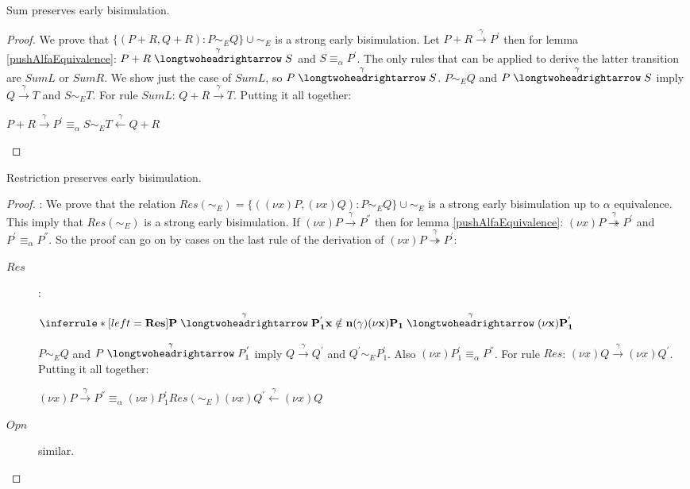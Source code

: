 \begin{lemma}
  Sum preserves early bisimulation. 
  \begin{proof}
    We prove that $\{(P+R, Q+R): P\sim_{E}Q\}\cup \sim_{E}$ is a strong early bisimulation. Let $P+R\xrightarrow{\gamma}P^{'}$ then for lemma \ref{pushAlfaEquivalence}: $P+R\stackrel{\gamma}{\longtwoheadrightarrow} S$ and $S\equiv_{\alpha}P^{'}$. The only rules that can be applied to derive the latter transition are $SumL$ or $SumR$. We show just the case of $SumL$, so $P\stackrel{\gamma}{\longtwoheadrightarrow} S$. $P\sim_{E} Q$ and $P\stackrel{\gamma}{\longtwoheadrightarrow} S$ imply $Q\xrightarrow{\gamma} T$ and $S\sim_{E} T$. For rule $SumL$: $Q+R\xrightarrow{\gamma} T$. Putting it all together:
    \begin{center}
      $P+R\xrightarrow{\gamma}P^{'} \equiv_{\alpha} S \sim_{E} T \stackrel{\gamma}{\longleftarrow} Q+R$
    \end{center}
  \end{proof}
\end{lemma}

\begin{lemma}
  Restriction preserves early bisimulation.
  \begin{proof}:
      We prove that the relation $Res(\sim_{E})=\{((\nu x)P, (\nu x)Q): P\sim_{E} Q\} \cup \sim_{E}$ is a strong early bisimulation up to $\alpha$ equivalence. This imply that $Res(\sim_{E})$ is a strong early bisimulation. If $(\nu x)P\xrightarrow{\gamma}P^{''}$ then for lemma \ref{pushAlfaEquivalence}: $(\nu x)P\stackrel{\gamma}{\twoheadrightarrow}P^{'}$ and $P^{'}\equiv_{\alpha}P^{''}$. So the proof can go on by cases on the last rule of the derivation of $(\nu x)P\stackrel{\gamma}{\twoheadrightarrow} P^{'}$:
	\begin{description}
 	  \item[$Res$]:
   	    \begin{center}
   	      $\inferrule* [left=\bf{Res}]{
		    P \stackrel{\gamma}{\longtwoheadrightarrow} P_{1}^{'}
		  \\
		    x \notin n(\gamma)
		  }{
		    (\nu x)P_{1} \stackrel{\gamma}{\longtwoheadrightarrow} (\nu x)P_{1}^{'}
	      }$
   	    \end{center}
 	    $P\sim_{E}Q$ and $P \stackrel{\gamma}{\longtwoheadrightarrow} P_{1}^{'}$ imply $Q \xrightarrow{\gamma} Q^{'}$ and $Q^{'} \sim_{E} P_{1}^{'}$. Also $(\nu x)P_{1}^{'} \equiv_{\alpha} P^{''}$. For rule $Res$: $(\nu x)Q \xrightarrow{\gamma} (\nu x)Q^{'}$. Putting it all together:
 	    \begin{center}
 	      $(\nu x)P \xrightarrow{\gamma} P^{''} \equiv_{\alpha} (\nu x)P_{1}^{'}  Res(\sim_{E}) (\nu x)Q^{'} \stackrel{\gamma}{\leftarrow} (\nu x)Q$
 	    \end{center}
  	  \item[$Opn$] similar.
	\end{description}
  \end{proof}
\end{lemma}



